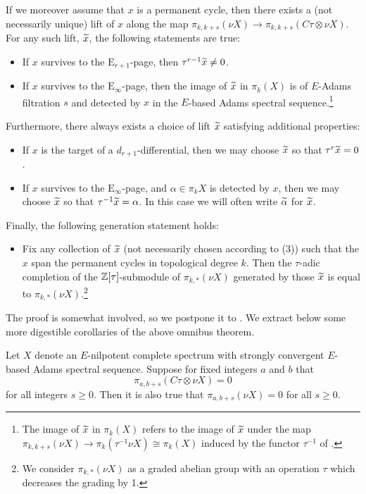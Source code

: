 \begin{thm}
  If we moreover assume that $x$ is a permanent cycle, then there exists a (not necessarily unique) lift of $x$ along the map
  $\pi_{k,k+s}(\nu X) \to \pi_{k,k+s}(C\tau \otimes \nu X)$.  For any such lift, $\wt{x}$, the following statements are true:
  \begin{itemize}
  \item[(2a)] If $x$ survives to the $\mathrm{E}_{r+1}$-page, then $\tau^{r-1} \wt{x} \neq 0$.
  \item[(2b)] If $x$ survives to the $\mathrm{E}_\infty$-page, then the image of $\wt{x}$ in $\pi_{k} (X)$ is of $E$-Adams filtration $s$ and detected by $x$ in the $E$-based Adams spectral sequence.\footnote{The image of $\wt{x}$ in $\pi_{k} (X)$ refers to the image of $\wt{x}$ under the map $\pi_{k,k+s} (\nu X) \to \pi_{k} (\tau^{-1} \nu X) \cong \pi_k (X)$ induced by the functor $\tau^{-1}$ of .}
  \end{itemize}
  Furthermore, there always exists a choice of lift $\wt{x}$ satisfying additional properties:
  \begin{itemize}
  \item[(3a)] If $x$ is the target of a $d_{r+1}$-differential, then we may choose $\wt{x}$ so that $\tau^r \wt{x} = 0$.
  \item[(3b)] If $x$ survives to the $\mathrm{E}_\infty$-page, and $\alpha \in \pi_k X$ is detected by $x$, then we may choose $\wt{x}$ so that
    $\tau^{-1} \wt{x} = \alpha$. In this case we will often write $\wt{\alpha}$ for $\wt{x}$.
  \end{itemize}
  Finally, the following generation statement holds:
  \begin{itemize}
  \item[(4)] Fix any collection of $\wt{x}$ (not necessarily chosen according to (3)) such that the $x$ span the permanent cycles in topological degree $k$.  Then the $\tau$-adic completion of the $\mathbb{Z}[\tau]$-submodule of $\pi_{k,*}(\nu X)$ generated by those $\wt{x}$ is equal to $\pi_{k,*} (\nu X)$.\footnote{We consider $\pi_{k,*}(\nu X)$ as a graded abelian group with an operation $\tau$ which decreases the grading by 1.}
  \end{itemize}
\end{thm}

The proof is somewhat involved, so we postpone it to .
We extract below some more digestible corollaries of the above omnibus theorem.

\begin{cor}\label{lemm:ctaugoodenough}
  Let $X$ denote an $E$-nilpotent complete spectrum with strongly convergent $E$-based Adams spectral sequence.
  Suppose for fixed integers $a$ and $b$ that 
  $$\pi_{a,b+s} (C\tau \otimes \nu X) = 0$$
	for all integers $s \geq 0$.   Then it is also true that $\pi_{a,b+s} (\nu X) = 0$ for all $s \geq 0$.
\end{cor}


